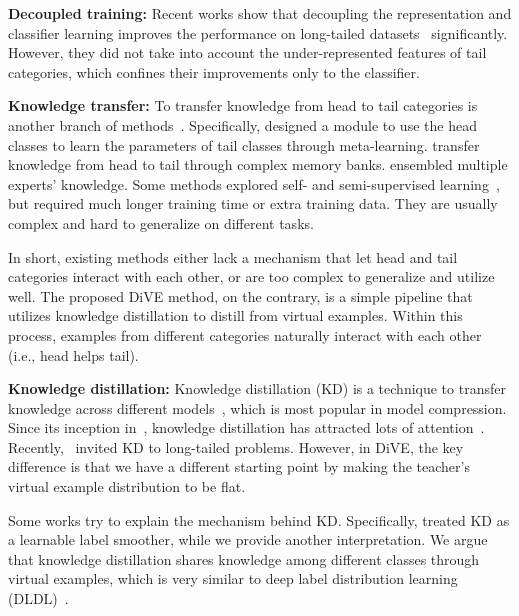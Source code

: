 \documentclass[10pt,twocolumn,letterpaper]{article}
\begin{document}
\textbf{Decoupled training:} Recent works show that decoupling the representation and classifier learning improves the performance on long-tailed datasets~\cite{kang2019decoupling,zhou2020BBN} significantly. However, they did not take into account the under-represented features of tail categories, which confines their improvements only to the classifier. 

\textbf{Knowledge transfer:} To transfer knowledge from head to tail categories is another branch of methods~\cite{wang2017learning,liu2019openlongtailrecognition, zhu2020inflated,xiang2020LFME}. Specifically, \cite{wang2017learning} designed a module to use the head classes to learn the parameters of tail classes through meta-learning. \cite{liu2019openlongtailrecognition,zhu2020inflated} transfer knowledge from head to tail through complex memory banks. \cite{zhou2020BBN, xiang2020LFME, wang2020long} ensembled multiple experts' knowledge.  Some methods explored self- and semi-supervised learning~\cite{yang2020rethinking}, but required much longer training time or extra training data. They are usually complex and hard to generalize on different tasks.

In short, existing methods either lack a mechanism that let head and tail categories interact with each other, or are too complex to generalize and utilize well. The proposed DiVE method, on the contrary, is a simple pipeline that utilizes knowledge distillation to distill from virtual examples. Within this process, examples from different categories naturally interact with each other (i.e., head helps tail).

\textbf{Knowledge distillation:} Knowledge distillation (KD) is a technique to transfer knowledge across different models~\cite{hinton2015distilling}, which is most popular in model compression. Since its inception in~\cite{hinton2015distilling}, knowledge distillation has attracted lots of attention~\cite{yang2020rethinking, yim2017gift}. Recently,~\cite{xiang2020LFME, mullapudi2021background} invited KD to long-tailed problems. However, in DiVE, the key difference is that we have a different starting point by making the teacher's virtual example distribution to be flat.

Some works try to explain the mechanism behind KD. Specifically, \cite{yuan2020revisitingkd} treated KD as a learnable label smoother, while we provide another interpretation. We argue that knowledge distillation shares knowledge among different classes through virtual examples, which is very similar to deep label distribution learning (DLDL)~\cite{gao2017DLDL}.
\end{document}
